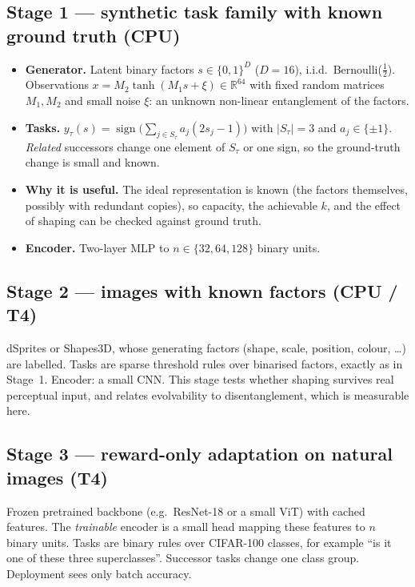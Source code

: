 \documentclass[11pt,a4paper]{article}
\theoremstyle{definition}
\theoremstyle{plain}
\theoremstyle{remark}
\newcommand{\R}{\mathbb{R}}
\newcommand{\sign}{\operatorname{sign}}
\begin{document}
\subsection{Stage 1 --- synthetic task family with known ground truth (CPU)}

\begin{itemize}
\item \textbf{Generator.} Latent binary factors $s\in\{0,1\}^D$ ($D=16$), i.i.d.\ Bernoulli($\tfrac12$). Observations $x = M_2\tanh(M_1 s + \xi)\in\R^{64}$ with fixed random matrices $M_1,M_2$ and small noise $\xi$: an unknown non-linear entanglement of the factors.
\item \textbf{Tasks.} $y_\tau(s) = \sign\big(\sum_{j\in S_\tau} a_j(2s_j-1)\big)$ with $|S_\tau|=3$ and $a_j\in\{\pm1\}$. \emph{Related} successors change one element of $S_\tau$ or one sign, so the ground-truth change is small and known.
\item \textbf{Why it is useful.} The ideal representation is known (the factors themselves, possibly with redundant copies), so capacity, the achievable $k$, and the effect of shaping can be checked against ground truth.
\item \textbf{Encoder.} Two-layer MLP to $n\in\{32,64,128\}$ binary units.
\end{itemize}

\subsection{Stage 2 --- images with known factors (CPU / T4)}
dSprites or Shapes3D, whose generating factors (shape, scale, position, colour, \dots) are labelled. Tasks are sparse threshold rules over binarised factors, exactly as in Stage~1. Encoder: a small CNN. This stage tests whether shaping survives real perceptual input, and relates evolvability to disentanglement, which is measurable here.

\subsection{Stage 3 --- reward-only adaptation on natural images (T4)}
Frozen pretrained backbone (e.g.\ ResNet-18 or a small ViT) with cached features. The \emph{trainable} encoder is a small head mapping these features to $n$ binary units. Tasks are binary rules over CIFAR-100 classes, for example ``is it one of these three superclasses''. Successor tasks change one class group. Deployment sees only batch accuracy.
\end{document}
